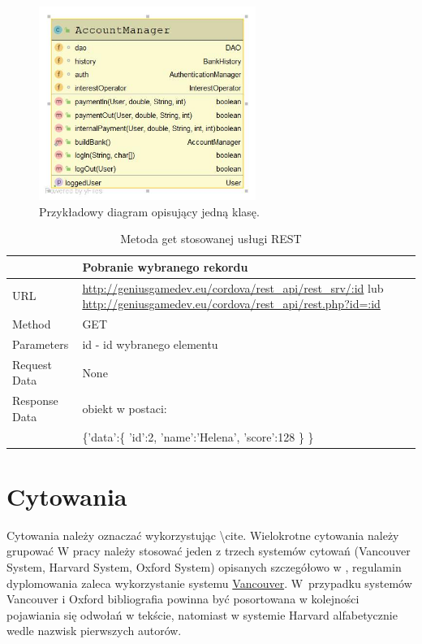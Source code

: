 \documentclass{wfiisul}
\begin{document}
\begin{figure}[!h]
\centering
\includegraphics[width = 200pt]{DiagramKlasy.jpg}
\caption{Przykładowy diagram opisujący jedną klasę.}\label{diagram_wybranej_klasy}
\end{figure}

\begin{table}
\begin{tabularx}{\textwidth}{|l|X|}
\hline
&\textbf{Pobranie wybranego rekordu}\\\hline
URL &   \url{http://geniusgamedev.eu/cordova/rest_api/rest_srv/:id} lub \url{http://geniusgamedev.eu/cordova/rest_api/rest.php?id=:id}\\\hline
Method  & GET\\\hline
Parameters  & id - id wybranego elementu \\\hline
Request Data & None\\\hline
Response Data & obiekt w postaci:\\
&

\{'data':\{
    'id':2,
    'name':'Helena',
    'score':128
    \}
\}

\\\hline
\end{tabularx}
\caption{Metoda get stosowanej usługi REST}\label{rest1}
\end{table}

\section{Cytowania}
Cytowania należy oznaczać wykorzystując {\textbackslash}cite. Wielokrotne cytowania należy grupować \cite{Bekart, Cytowanie, latex_math_wiki, Procedura_dyplomowania} W pracy należy stosować jeden z trzech systemów cytowań (Vancouver System, Harvard System, Oxford System) opisanych szczegółowo w \cite{Cytowanie}, regulamin dyplomowania zaleca wykorzystanie systemu \underline{Vancouver}. W~przypadku systemów Vancouver i Oxford bibliografia powinna być posortowana w kolejności pojawiania się odwołań w tekście, natomiast w systemie Harvard alfabetycznie wedle nazwisk pierwszych autorów.
\end{document}
